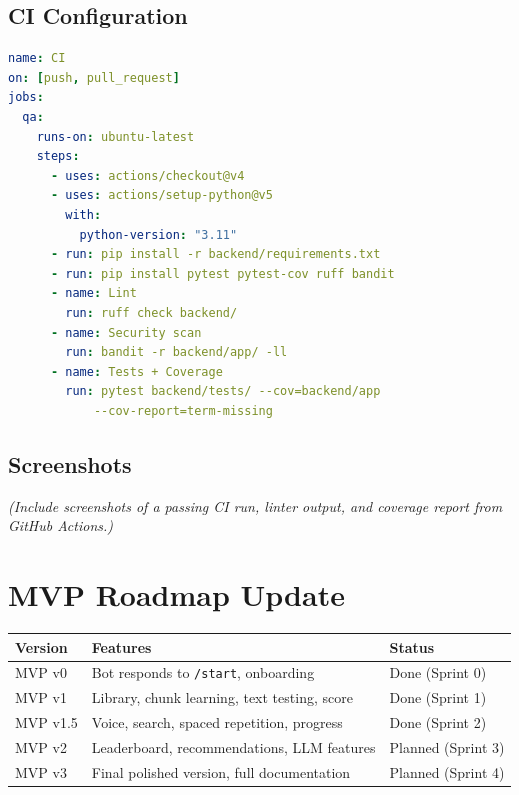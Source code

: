 \documentclass[11pt, a4paper]{article}
\begin{document}
\subsection*{CI Configuration}

\begin{lstlisting}[language=yaml, caption=.github/workflows/ci.yml]
name: CI
on: [push, pull_request]
jobs:
  qa:
    runs-on: ubuntu-latest
    steps:
      - uses: actions/checkout@v4
      - uses: actions/setup-python@v5
        with:
          python-version: "3.11"
      - run: pip install -r backend/requirements.txt
      - run: pip install pytest pytest-cov ruff bandit
      - name: Lint
        run: ruff check backend/
      - name: Security scan
        run: bandit -r backend/app/ -ll
      - name: Tests + Coverage
        run: pytest backend/tests/ --cov=backend/app
            --cov-report=term-missing
\end{lstlisting}

\subsection*{Screenshots}

\textit{(Include screenshots of a passing CI run, linter output, and coverage report from GitHub Actions.)}


\section{MVP Roadmap Update}

\begin{center}
\begin{tabular}{|l|l|l|}
\hline
\textbf{Version} & \textbf{Features} & \textbf{Status} \\
\hline
MVP v0 & Bot responds to \texttt{/start}, onboarding & Done (Sprint 0) \\
\hline
MVP v1 & Library, chunk learning, text testing, score & Done (Sprint 1) \\
\hline
MVP v1.5 & Voice, search, spaced repetition, progress & Done (Sprint 2) \\
\hline
MVP v2 & Leaderboard, recommendations, LLM features & Planned (Sprint 3) \\
\hline
MVP v3 & Final polished version, full documentation & Planned (Sprint 4) \\
\hline
\end{tabular}
\end{center}
\end{document}
